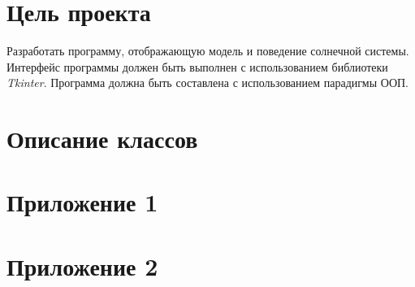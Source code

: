 \documentclass[11pt,a4paper]{report}
\begin{document}
\section{Цель проекта}
Разработать программу, отображающую модель и поведение солнечной системы. Интерфейс программы должен быть выполнен с использованием библиотеки \textit{Tkinter}. Программа должна быть составлена с использованием парадигмы ООП.

\section{Описание классов}





\section{Приложение 1}

\section{Приложение 2}
\end{document}

